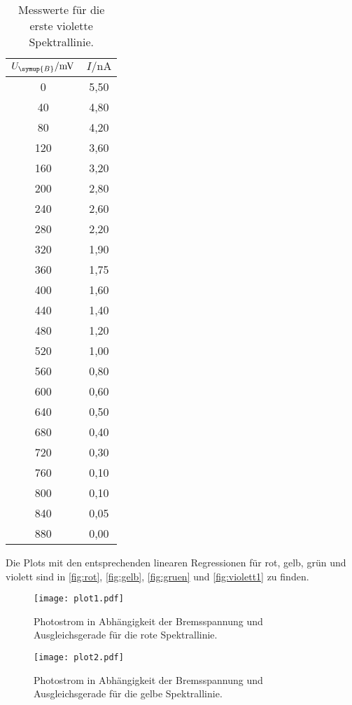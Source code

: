 \begin{table}[!hbt]
    \centering
    \caption{Messwerte für die erste violette Spektrallinie.}
    \label{tab:violett1}
    \begin{tabular}{c c}
        \toprule
        $U_{\symup{B}} / \unit{\milli\volt}$ & $I / \unit{\nano\ampere}$ \\
        \midrule
          0 & 5,50 \\
         40 & 4,80 \\
         80 & 4,20 \\
        120 & 3,60 \\
        160 & 3,20 \\
        200 & 2,80 \\
        240 & 2,60 \\
        280 & 2,20 \\
        320 & 1,90 \\
        360 & 1,75 \\
        400 & 1,60 \\
        440 & 1,40 \\
        480 & 1,20 \\
        520 & 1,00 \\
        560 & 0,80 \\
        600 & 0,60 \\
        640 & 0,50 \\
        680 & 0,40 \\
        720 & 0,30 \\
        760 & 0,10 \\
        800 & 0,10 \\
        840 & 0,05 \\
        880 & 0,00 \\
        \bottomrule
    \end{tabular}
\end{table}

Die Plots mit den entsprechenden linearen Regressionen für rot, gelb, grün und violett sind in \autoref{fig:rot},
\autoref{fig:gelb}, \autoref{fig:gruen} und \autoref{fig:violett1} zu finden.
\begin{figure}[!hbt]
    \centering
    \label{fig:rot}
    \caption{Photostrom in Abhängigkeit der Bremsspannung und Ausgleichsgerade für die rote Spektrallinie.}
    \texttt{[image: plot1.pdf]}
\end{figure}

\begin{figure}[!hbt]
    \centering
    \label{fig:gelb}
    \caption{Photostrom in Abhängigkeit der Bremsspannung und Ausgleichsgerade für die gelbe Spektrallinie.}
    \texttt{[image: plot2.pdf]}
\end{figure}


